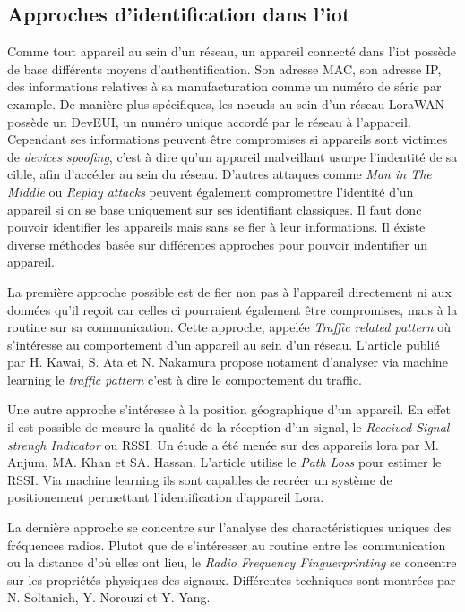 \subsection{Approches d'identification dans l'iot}

Comme tout appareil au sein d'un réseau, un appareil connecté dans l'iot possède de base différents moyens d'authentification. Son adresse MAC, son adresse IP, des informations relatives à sa manufacturation comme un numéro de série par example. De manière plus spécifiques, les noeuds au sein d'un réseau LoraWAN possède un DevEUI, un numéro unique accordé par le réseau à l'appareil. Cependant ses informations peuvent être compromises si appareils sont victimes de \textit{devices spoofing}, c'est à dire qu'un appareil malveillant usurpe l'indentité de sa cible, afin d'accéder au sein du réseau. D'autres attaques comme \textit{Man in The Middle} ou \textit{Replay attacks} peuvent également compromettre l'identité d'un appareil si on se base uniquement sur ses identifiant classiques\cite{attack}. Il faut donc pouvoir identifier les appareils mais sans se fier à leur informations. Il éxiste diverse méthodes basée sur différentes approches pour pouvoir indentifier un appareil. 

La première approche possible est de fier non pas à l'appareil directement ni aux données qu'il reçoit car celles ci pourraient également être compromises, mais à la routine sur sa communication. Cette approche, appelée \textit{Traffic related pattern} où s'intéresse au comportement d'un appareil au sein d'un réseau. L'article publié par H. Kawai, S. Ata et N. Nakamura \cite{pattern} propose notament d'analyser via machine learning le \textit{traffic pattern} c'est à dire le comportement du traffic.

Une autre approche s'intéresse à la position géographique d'un appareil. En effet il est possible de mesure la qualité de la réception d'un signal, le \textit{Received Signal strengh Indicator} ou RSSI. Un étude a été menée sur des appareils lora par M. Anjum, MA. Khan et SA. Hassan\cite{rssi}. L'article utilise le \textit{Path Loss} pour estimer le RSSI. Via machine learning ils sont capables de recréer un système de positionement permettant l'identification d'appareil Lora.

La dernière approche se concentre sur l'analyse des charactéristiques uniques des fréquences radios. Plutot que de s'intéresser au routine entre les communication ou la distance d'où elles ont lieu, le \textit{Radio Frequency Finguerprinting} se concentre sur les propriétés physiques des signaux. Différentes techniques sont montrées par N. Soltanieh, Y. Norouzi et Y. Yang\cite{rffi1}.


